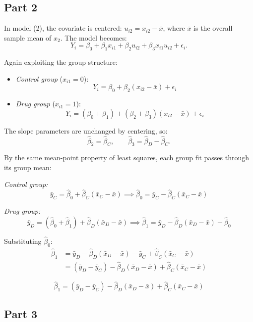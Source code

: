 \documentclass[letterpaper]{article}
\begin{document}
	\subsection{Part 2}

	In model (2), the covariate is centered: $u_{i2} = x_{i2} - \bar{x}$, where $\bar{x}$ is the overall sample mean of $x_2$. The model becomes:
	\[
	Y_i = \beta_0 + \beta_1 x_{i1} + \beta_2 u_{i2} + \beta_3 x_{i1} u_{i2} + \epsilon_i.
	\]
	
	Again exploiting the group structure:
	
	\begin{itemize}
		\item \textit{Control group} ($x_{i1} = 0$):
		\[
		Y_i = \beta_0 + \beta_2 (x_{i2} - \bar{x}) + \epsilon_i
		\]
		\item \textit{Drug group} ($x_{i1} = 1$):
		\[
		Y_i = (\beta_0 + \beta_1) + (\beta_2 + \beta_3)(x_{i2} - \bar{x}) + \epsilon_i
		\]
	\end{itemize}
	
	The slope parameters are unchanged by centering, so:
	\[
	\hat{\beta}_2 = \hat{\beta}_C, \qquad \hat{\beta}_3 = \hat{\beta}_D - \hat{\beta}_C.
	\]
	

	By the same mean-point property of least squares, each group fit passes through its group mean:
	
	\textit{Control group:}
	\[
	\bar{y}_C = \hat{\beta}_0 + \hat{\beta}_C(\bar{x}_C - \bar{x})
	\implies \hat{\beta}_0 = \bar{y}_C - \hat{\beta}_C(\bar{x}_C - \bar{x})
	\]
	
	\textit{Drug group:}
	\[
	\bar{y}_D = (\hat{\beta}_0 + \hat{\beta}_1) + \hat{\beta}_D(\bar{x}_D - \bar{x})
	\implies \hat{\beta}_1 = \bar{y}_D - \hat{\beta}_D(\bar{x}_D - \bar{x}) - \hat{\beta}_0
	\]
	
	Substituting $\hat{\beta}_0$:
	\begin{align*}
		\hat{\beta}_1 &= \bar{y}_D - \hat{\beta}_D(\bar{x}_D - \bar{x})
		- \bar{y}_C + \hat{\beta}_C(\bar{x}_C - \bar{x}) \\[4pt]
		&= (\bar{y}_D - \bar{y}_C)
		- \hat{\beta}_D(\bar{x}_D - \bar{x})
		+ \hat{\beta}_C(\bar{x}_C - \bar{x})
	\end{align*}
	
	\[
	\boxed{\hat{\beta}_1 = (\bar{y}_D - \bar{y}_C) - \hat{\beta}_D(\bar{x}_D - \bar{x}) + \hat{\beta}_C(\bar{x}_C - \bar{x})}
	\]
	
	\subsection{Part 3}
	
\end{document}
